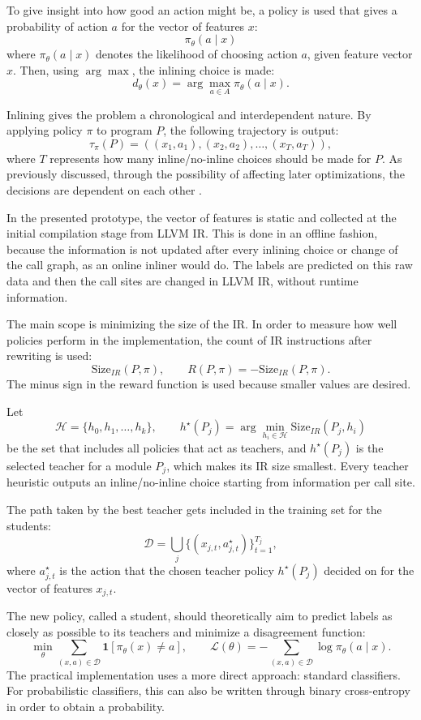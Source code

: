 \documentclass[12pt, a4paper]{report}
\begin{document}
To give insight into how good an action might be, a policy is used that gives a
probability of action \(a\) for the vector of features \(x\):
\[
  \pi_\theta(a \mid x)
\]
where \(\pi_\theta(a \mid x)\) denotes the likelihood of choosing action \(a\),
given feature vector \(x\). Then, using \(\arg\max\), the inlining choice is
made:
\[
  d_\theta(x) = \arg\max_{a \in A}\pi_\theta(a \mid x).
\]

Inlining gives the problem a chronological and interdependent nature. By
applying policy \(\pi\) to program \(P\), the following trajectory is output:
\[
  \tau_{\pi}(P)
  =
  ((x_1,a_1),(x_2,a_2),\ldots,(x_T,a_T)),
\]
where \(T\) represents how many inline/no-inline choices should be made for
\(P\). As previously discussed, through the possibility of affecting later
optimizations, the decisions are dependent on each other \cite{mlgo,bcmax}.

In the presented prototype, the vector of features is static and collected at
the initial compilation stage from LLVM IR. This is done in an offline fashion,
because the information is not updated after every inlining choice or change of
the call graph, as an online inliner would do. The labels are predicted on this
raw data and then the call sites are changed in LLVM IR, without runtime
information.

The main scope is minimizing the size of the IR. In order to measure how well
policies perform in the implementation, the count of IR instructions after
rewriting is used:
\[
  \mathrm{Size}_{IR}(P,\pi), \qquad
  R(P,\pi) = -\mathrm{Size}_{IR}(P,\pi).
\]
The minus sign in the reward function is used because smaller values are
desired.

Let
\[
  \mathcal{H} = \{h_0,h_1,\ldots,h_k\}, \qquad
  h^\star(P_j)=
  \arg\min_{h_i \in \mathcal{H}} \mathrm{Size}_{IR}(P_j,h_i)
\]
be the set that includes all policies that act as teachers, and \(h^\star(P_j)\)
is the selected teacher for a module \(P_j\), which makes its IR size smallest.
Every teacher heuristic outputs an inline/no-inline choice starting from
information per call site.

The path taken by the best teacher gets included in the training set for the
students:
\[
  \mathcal{D}
  =
  \bigcup_j
  \{(x_{j,t}, a^{\star}_{j,t})\}_{t=1}^{T_j},
\]
where \(a^{\star}_{j,t}\) is the action that the chosen teacher policy
\(h^\star(P_j)\) decided on for the vector of features \(x_{j,t}\).

The new policy, called a student, should theoretically aim to predict labels as
closely as possible to its teachers and minimize a disagreement function:
\[
  \min_{\theta}\sum_{(x,a)\in \mathcal{D}}
  \mathbf{1}[\pi_\theta(x) \neq a], \qquad
  \mathcal{L}(\theta)
  =
  -\sum_{(x,a)\in\mathcal{D}}\log \pi_\theta(a \mid x).
\]
The practical implementation uses a more direct approach: standard classifiers.
For probabilistic classifiers, this can also be written through binary
cross-entropy in order to obtain a probability.
\end{document}
